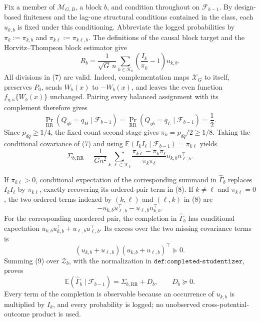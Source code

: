 Fix a member of \(\mathcal M_{G,B}\), a block \(b\), and condition throughout on \(\mathcal F_{b-1}\).  By design-based finiteness and the lag-one structural conditions contained in the class, each \(u_{k,b}\) is fixed under this conditioning.  Abbreviate the logged probabilities by \(\pi_k:=\pi_{k,b}\) and \(\pi_{k\ell}:=\pi_{k\ell,b}\).  The definitions of the causal block target and the Horvitz--Thompson block estimator give
\[
 R_b=\frac1{\sqrt G\,n}\sum_{k\in\mathcal K_b}
       \left(\frac{I_k}{\pi_k}-1\right)u_{k,b}.             \tag{7}
\]
All divisions in (7) are valid.  Indeed, complementation maps \(\mathcal X_G\) to itself, preserves \(P_0\), sends \(W_b(x)\) to \(-W_b(x)\), and leaves the even function \(f_{\eta,\kappa}\{W_b(x)\}\) unchanged.  Pairing every balanced assignment with its complement therefore gives
\[
 \Pr_{\mathrm{RR}}(Q_{gb}=q_H\mid\mathcal F_{b-1})
 =\Pr_{\mathrm{RR}}(Q_{gb}=q_L\mid\mathcal F_{b-1})=\frac12.
\]
Since \(p_{dq}\geq1/4\), the fixed-count second stage gives \(\pi_k=p_{dq}/2\geq1/8\).  Taking the conditional covariance of (7) and using \(\mathbb E(I_kI_\ell\mid\mathcal F_{b-1})=\pi_{k\ell}\) yields
\[
 \Sigma_{b,\mathrm{RR}}
 =\frac1{Gn^2}\sum_{k,\ell\in\mathcal K_b}
   \frac{\pi_{k\ell}-\pi_k\pi_\ell}{\pi_k\pi_\ell}
   u_{k,b}u_{\ell,b}^\top.                                 \tag{8}
\]

If \(\pi_{k\ell}>0\), conditional expectation of the corresponding summand in \(\widehat\Gamma_b\) replaces \(I_kI_\ell\) by \(\pi_{k\ell}\), exactly recovering its ordered-pair term in (8).  If \(k\ne\ell\) and \(\pi_{k\ell}=0\), the two ordered terms indexed by \((k,\ell)\) and \((\ell,k)\) in (8) are
\[
 -u_{k,b}u_{\ell,b}^\top-u_{\ell,b}u_{k,b}^\top.
\]
For the corresponding unordered pair, the completion in \(\widehat\Gamma_b\) has conditional expectation \(u_{k,b}u_{k,b}^\top+u_{\ell,b}u_{\ell,b}^\top\).  Its excess over the two missing covariance terms is
\[
 (u_{k,b}+u_{\ell,b})(u_{k,b}+u_{\ell,b})^\top\succeq0.   \tag{9}
\]
Summing (9) over \(\mathcal Z_b\), with the normalization in \(\texttt{def:completed-studentizer}\), proves
\[
 \mathbb E(\widehat\Gamma_b\mid\mathcal F_{b-1})
 =\Sigma_{b,\mathrm{RR}}+D_b,
 \qquad D_b\succeq0.                                      \tag{10}
\]
Every term of the completion is observable because an occurrence of \(u_{k,b}\) is multiplied by \(I_k\), and every probability is logged; no unobserved cross-potential-outcome product is used.

